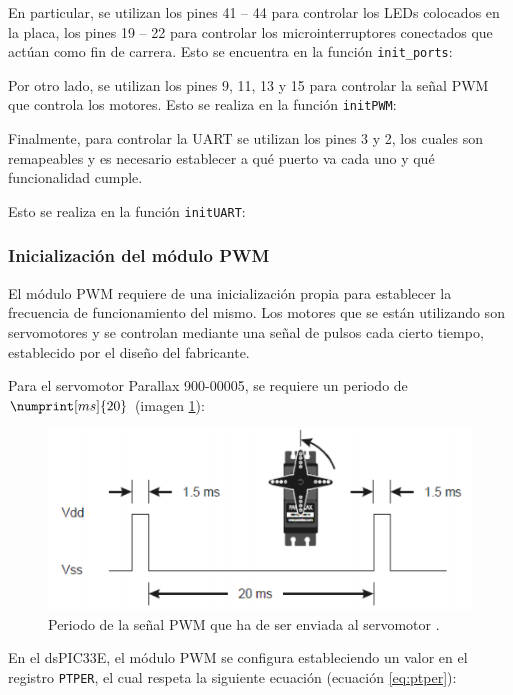 En particular, se utilizan los pines 41 -- 44 para controlar los LEDs colocados en la
placa, los pines 19 -- 22 para controlar los microinterruptores conectados que actúan
como fin de carrera. Esto se encuentra en la función \texttt{init\_ports}:



Por otro lado, se utilizan los pines 9, 11, 13 y 15 para controlar la señal \ac{PWM}
que controla los motores. Esto se realiza en la función \texttt{initPWM}:



Finalmente, para controlar la \ac{UART} se utilizan los pines 3 y 2, los cuales son
remapeables y es necesario establecer a qué puerto va cada uno y qué funcionalidad cumple.

Esto se realiza en la función \texttt{initUART}:


\subsubsection{Inicialización del módulo \ac{PWM}}
El módulo \ac{PWM} requiere de una inicialización propia para establecer la frecuencia
de funcionamiento del mismo. Los motores que se están utilizando son servomotores
y se controlan mediante una señal de pulsos cada cierto tiempo, establecido por el 
diseño del fabricante.

Para el servomotor Parallax 900-00005, se requiere un periodo de $\numprint[ms]{20}$
(imagen \ref{fig:servo_pwm}):

\begin{figure}[H]
    \centering
    \includegraphics[width=.6\linewidth]{pictures/servo_pwm.png}
    \caption{Periodo de la señal \ac{PWM} que ha de ser enviada al servomotor \cite{90000005ServomotorParallax}.}
    \label{fig:servo_pwm}
\end{figure}

En el dsPIC33E, el módulo \ac{PWM} se configura estableciendo un valor en el registro
\texttt{PTPER}, el cual respeta la siguiente ecuación (ecuación \ref{eq:ptper}):

